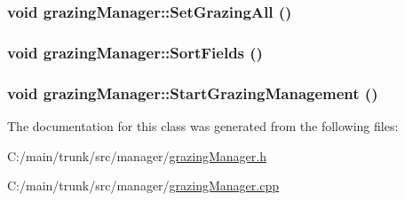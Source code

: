 \label{classgrazing_manager_af4d75fc52160ba2df1afa74db9727e5c}
\hypertarget{classgrazing_manager_a6f11fda1e9b60ffac195adb3d93d6ca7}{
\subsubsection[{SetGrazingAll}]{\setlength{\rightskip}{0pt plus 5cm}void grazingManager::SetGrazingAll ()}}
\label{classgrazing_manager_a6f11fda1e9b60ffac195adb3d93d6ca7}
\hypertarget{classgrazing_manager_ab0930ab0af01943e76429ecdbb9d9dfd}{
\subsubsection[{SortFields}]{\setlength{\rightskip}{0pt plus 5cm}void grazingManager::SortFields ()}}
\label{classgrazing_manager_ab0930ab0af01943e76429ecdbb9d9dfd}
\hypertarget{classgrazing_manager_a52d950e97efbe047f9fec1493a0ce62e}{
\subsubsection[{StartGrazingManagement}]{\setlength{\rightskip}{0pt plus 5cm}void grazingManager::StartGrazingManagement ()}}
\label{classgrazing_manager_a52d950e97efbe047f9fec1493a0ce62e}


The documentation for this class was generated from the following files:\begin{DoxyCompactItemize}
\item 
C:/main/trunk/src/manager/\hyperlink{grazing_manager_8h}{grazingManager.h}\item 
C:/main/trunk/src/manager/\hyperlink{grazing_manager_8cpp}{grazingManager.cpp}\end{DoxyCompactItemize}
